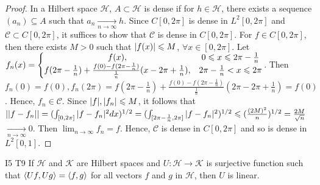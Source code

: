 \begin{proof}
    In a Hilbert space $\mathscr{H}$, $A\subset \mathscr{H}$ is dense if for $h\in\mathscr{H}$, there exists
    a sequence $(a_n)\subseteq A$ such that $a_n\underset{n\rightarrow \infty}{\longrightarrow} h$.
    Since $C[0,2\pi]$ is dense in $L^2[0,2\pi]$ and $\mathscr{C}\subset C[0,2\pi]$, it suffices to show that $\mathscr{C}$ is dense in $C[0,2\pi]$.
    For $f\in C[0,2\pi]$, then there exists $M>0$ such that $|f(x)|\leqslant M$, $\forall x\in [0,2\pi]$.
    Let  $f_n(x)=\left\{\begin{matrix}
       f(x) ,& 0\leqslant x\leqslant 2\pi-\frac{1}{n} \\
       f(2\pi-\frac{1}{n}) + \frac{f(0)-f(2\pi-\frac{1}{n})}{\frac{1}{n}}(x-2\pi+\frac{1}{n}) ,& 2\pi-\frac{1}{n}<x\leqslant 2\pi
      \end{matrix}\right.$.
    Then $f_n(0)=f(0),f_n(2\pi)=f(2\pi-\frac{1}{n}) + \frac{f(0)-f(2\pi-\frac{1}{n})}{\frac{1}{n}}(2\pi-2\pi+\frac{1}{n})=f(0)$.
    Hence, $f_n\in\mathscr{C}$. 
    Since $|f|,|f_n|\leqslant M$, it follows that $||f-f_n||=(\int_{[0,2\pi]}|f-f_n|^2 dx)^{1/2}=(\int_{[2\pi-\frac{1}{n},2\pi]}|f-f_n|^2)^{1/2}\leqslant (\frac{(2M)^2}{n})^{1/2}=\frac{2M}{\sqrt{n}}$$\underset{n\rightarrow \infty}{\longrightarrow}0$.
    Then $\lim_{n\rightarrow \infty}f_n=f$. Hence, $\mathscr{C}$ is dense in $C[0,2\pi]$ and so is dense in $L^2[0,1]$.
\end{proof}


\begin{exercise}{I5 T9}{}
    If $\mathscr{H}$ and $\mathscr{K}$ are Hilbert spaces and $U:\mathscr{H}\rightarrow \mathscr{K}$ 
    is surjective function such that $\langle Uf,Ug\rangle=\langle f,g\rangle$ for all vectors $f$ and $g$
    in $\mathscr{H}$, then $U$ is linear.
\end{exercise}

